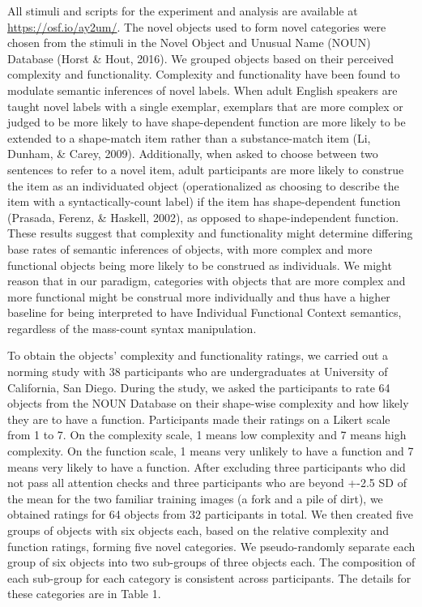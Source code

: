\documentclass[
  man,floatsintext]{apa6}
\begin{document}
All stimuli and scripts for the experiment and analysis are available at \url{https://osf.io/ay2um/}. The novel objects used to form novel categories were chosen from the stimuli in the Novel Object and Unusual Name (NOUN) Database (Horst \& Hout, 2016). We grouped objects based on their perceived complexity and functionality. Complexity and functionality have been found to modulate semantic inferences of novel labels. When adult English speakers are taught novel labels with a single exemplar, exemplars that are more complex or judged to be more likely to have shape-dependent function are more likely to be extended to a shape-match item rather than a substance-match item (Li, Dunham, \& Carey, 2009). Additionally, when asked to choose between two sentences to refer to a novel item, adult participants are more likely to construe the item as an individuated object (operationalized as choosing to describe the item with a syntactically-count label) if the item has shape-dependent function (Prasada, Ferenz, \& Haskell, 2002), as opposed to shape-independent function. These results suggest that complexity and functionality might determine differing base rates of semantic inferences of objects, with more complex and more functional objects being more likely to be construed as individuals. We might reason that in our paradigm, categories with objects that are more complex and more functional might be construal more individually and thus have a higher baseline for being interpreted to have Individual Functional Context semantics, regardless of the mass-count syntax manipulation.

To obtain the objects' complexity and functionality ratings, we carried out a norming study with 38 participants who are undergraduates at University of California, San Diego. During the study, we asked the participants to rate 64 objects from the NOUN Database on their shape-wise complexity and how likely they are to have a function. Participants made their ratings on a Likert scale from 1 to 7. On the complexity scale, 1 means low complexity and 7 means high complexity. On the function scale, 1 means very unlikely to have a function and 7 means very likely to have a function. After excluding three participants who did not pass all attention checks and three participants who are beyond +-2.5 SD of the mean for the two familiar training images (a fork and a pile of dirt), we obtained ratings for 64 objects from 32 participants in total. We then created five groups of objects with six objects each, based on the relative complexity and function ratings, forming five novel categories. We pseudo-randomly separate each group of six objects into two sub-groups of three objects each. The composition of each sub-group for each category is consistent across participants. The details for these categories are in Table 1.
\end{document}
